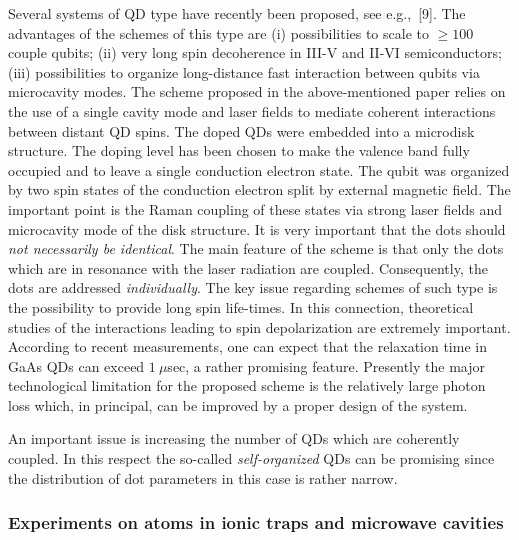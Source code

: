 Several systems of QD type have recently been proposed, see
e.g.,~[9]. The advantages of the schemes of this type are (i)
possibilities to scale to $\ge 100$ couple qubits; (ii) very long spin
decoherence in III-V and II-VI semiconductors; (iii) possibilities to
organize long-distance fast interaction between qubits via microcavity
modes. The scheme proposed in the above-mentioned paper relies on the
use of a single cavity mode and laser fields to mediate coherent
interactions between distant QD spins. The doped QDs were embedded
into a microdisk structure. The doping level has been chosen to make
the valence band fully occupied and to leave a single conduction
electron state. The qubit was organized by two spin states of the
conduction electron split by external magnetic field. The important
point is the Raman coupling of these states via strong laser fields
and microcavity mode of the disk structure. It is very important that
the dots should {\sl not necessarily be identical}. The main feature
of the scheme is that only the dots which are in resonance with the
laser radiation are coupled. Consequently, the dots are addressed {\sl
individually}. The key issue regarding schemes of such type is the
possibility to provide long spin life-times. In this connection,
theoretical studies of the interactions leading to spin depolarization
are extremely important. According to recent measurements, one can
expect that the relaxation time in GaAs QDs can exceed $1 \ \mu$sec,
a rather promising feature. 
Presently the major technological
limitation for the proposed scheme is the relatively large photon loss
which, in principal, can be improved by a proper design of the system.

An important issue is increasing the number of QDs which are coherently
coupled. In this respect the so-called {\sl self-organized} QDs can be
promising since the distribution of dot parameters in this case is
rather narrow.

\subsubsection{Experiments on atoms in ionic traps and microwave cavities}


